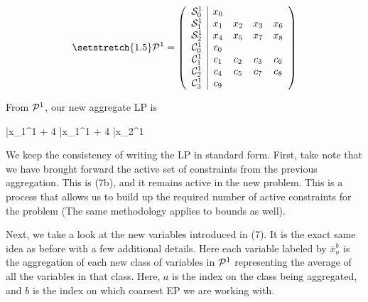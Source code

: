 \documentclass[11pt]{article} %
\newcommand{\cP}{{\cal P}}
\newcommand{\cC}{{\cal C}}
\newcommand{\cS}{{\cal S}}
\begin{document}
	\begin{equation}\setstretch{1.5}
	\mathcal{P}^1 = 
	\begin{pmatrix}
	\begin{array}{c|cccc}
	\cS_0^1 & x_0 &&& \\
	\cS_1^1 & x_1 & x_2 & x_3 & x_6 \\
	\cS_2^1& x_4 & x_5 & x_7 & x_8 \\
	\cC_0^1 & c_0 &&& \\
	\cC_1^1 & c_1 & c_2 & c_3 & c_6 \\
	\cC_2^1 & c_4 & c_5 & c_7 & c_8 \\
	\cC_3^1 & c_9 &&&
	\end{array}
	\end{pmatrix}
	\end{equation}
	
	From $\cP^1$, our new aggregate LP is 
	
	\begin{mini!}
		{}{\bar{x}_1^1 + 4 \bar{x}_1^1 + 4 \bar{x}_2^1}{}{}
	\end{mini!}
	
	We keep the consistency of writing the LP in standard form.  First, take note that we have brought forward the active set of constraints from the previous aggregation.  This is (7b), and it remains active in the new problem.  This is a process that allows us to build up the required number of active constraints for the problem (The same methodology applies to bounds as well).
	
	Next, we take a look at the new variables introduced in (7).  It is the exact same idea as before with a few additional details.  Here each variable labeled by $\bar{x}_a^b$ is the aggregation of each new class of variables in $\cP^1$ representing the average of all the variables in that class.  Here, $a$ is the index on the class being aggregated, and $b$ is the index on which coarsest EP we are working with.  
	
\end{document}
